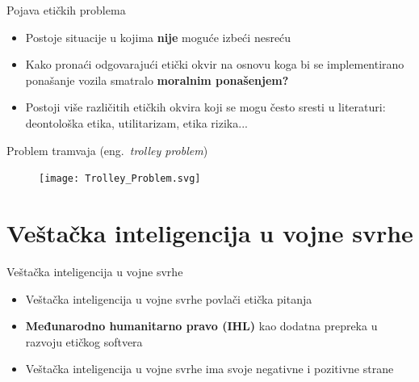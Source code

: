 \documentclass[14pt, aspectratio=169]{beamer}
\begin{document}
\begin{frame}{Pojava etičkih problema}
    \begin{itemize}
        \item <1-> Postoje situacije u kojima \textbf{nije} moguće izbeći nesreću
    \end{itemize}
    \begin{itemize}
        \item <2-> Kako pronaći odgovarajući etički okvir na osnovu koga bi se implementirano ponašanje vozila smatralo \textbf{moralnim ponašenjem? }
    \end{itemize}
    \begin{itemize}
        \item <3-> Postoji više različitih etičkih okvira koji se mogu često sresti u literaturi: deontološka etika, utilitarizam, etika rizika...
    \end{itemize}
\end{frame}

\begin{frame}{Problem tramvaja (eng.~{\em trolley problem})}
   \begin{figure}[h!]
        \begin{center}
            \texttt{[image: Trolley\_Problem.svg]}
        \end{center}
        \label{fig:minAI}
    \end{figure}
\end{frame}


\section{Veštačka inteligencija u vojne svrhe}

\begin{frame}{Veštačka inteligencija u vojne svrhe}
    \begin{itemize}
    
        \item Veštačka inteligencija u vojne svrhe povlači etička pitanja
        \item \textbf{Međunarodno humanitarno pravo (IHL)} kao dodatna prepreka u razvoju etičkog softvera
        \item Veštačka inteligencija u vojne svrhe ima svoje negativne i pozitivne strane
        
    \end{itemize}
\end{frame}
\end{document}
